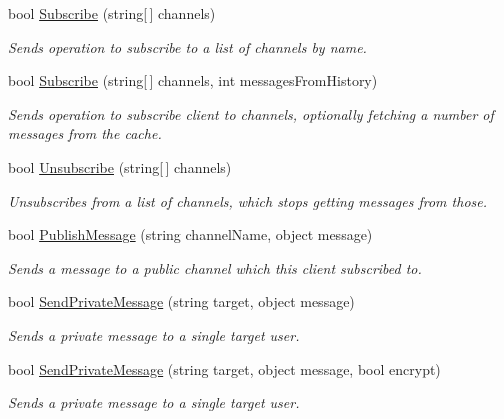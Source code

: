 \begin{DoxyCompactItemize}
\item 
bool \hyperlink{class_exit_games_1_1_client_1_1_photon_1_1_chat_1_1_chat_client_aecfdac4a2de6577291597477bcaec9c7}{Subscribe} (string\mbox{[}$\,$\mbox{]} channels)
\begin{DoxyCompactList}\small\item\em Sends operation to subscribe to a list of channels by name. \end{DoxyCompactList}\item 
bool \hyperlink{class_exit_games_1_1_client_1_1_photon_1_1_chat_1_1_chat_client_a6f6d0d0942fff96f3be1d7efbe1c00be}{Subscribe} (string\mbox{[}$\,$\mbox{]} channels, int messages\+From\+History)
\begin{DoxyCompactList}\small\item\em Sends operation to subscribe client to channels, optionally fetching a number of messages from the cache. \end{DoxyCompactList}\item 
bool \hyperlink{class_exit_games_1_1_client_1_1_photon_1_1_chat_1_1_chat_client_a5d233da812511bdf2f833461d4a501b6}{Unsubscribe} (string\mbox{[}$\,$\mbox{]} channels)
\begin{DoxyCompactList}\small\item\em Unsubscribes from a list of channels, which stops getting messages from those. \end{DoxyCompactList}\item 
bool \hyperlink{class_exit_games_1_1_client_1_1_photon_1_1_chat_1_1_chat_client_a0a8f7a1907bebc71607c3adedf11b9fd}{Publish\+Message} (string channel\+Name, object message)
\begin{DoxyCompactList}\small\item\em Sends a message to a public channel which this client subscribed to. \end{DoxyCompactList}\item 
bool \hyperlink{class_exit_games_1_1_client_1_1_photon_1_1_chat_1_1_chat_client_a423b766a0d908278cdced1e149d197b4}{Send\+Private\+Message} (string target, object message)
\begin{DoxyCompactList}\small\item\em Sends a private message to a single target user. \end{DoxyCompactList}\item 
bool \hyperlink{class_exit_games_1_1_client_1_1_photon_1_1_chat_1_1_chat_client_af671de33e90172784c8b0392571a1d72}{Send\+Private\+Message} (string target, object message, bool encrypt)
\begin{DoxyCompactList}\small\item\em Sends a private message to a single target user. \end{DoxyCompactList}\item 

\end{DoxyCompactItemize}
